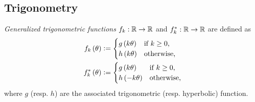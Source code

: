 \documentclass[stu, babel, american, biblatex, a4paper, leqno, draftall]{apa7}
\begin{document}
\subsection{Trigonometry}
\begin{definition}\label{M:Trigonometry}
    \textit{Generalized trigonometric functions} $f_k:\mathbb{R}\to\mathbb{R}$ and $f_k^\ast:\mathbb{R}\to\mathbb{R}$ are defined as
    \begin{align*}
        f_k\left(\theta\right)      & \vcentcolon=
        \begin{cases}
            g\left(k\theta\right) & \text{if $k\geq0$,} \\
            h\left(k\theta\right) & \text{otherwise,}   \\
        \end{cases} \\
        f_k^\ast\left(\theta\right) & \vcentcolon=
        \begin{cases}
            g\left(k\theta\right)  & \text{if $k\geq0$,} \\
            h\left(-k\theta\right) & \text{otherwise,}   \\
        \end{cases}
    \end{align*}
    where $g$ (resp. $h$) are the associated trigonometric (resp. hyperbolic) function.
\end{definition}
\end{document}
